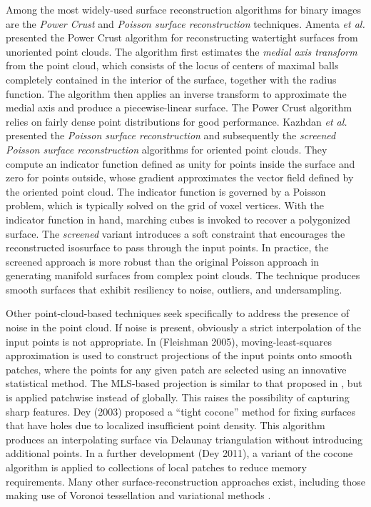 Among the most widely-used surface reconstruction algorithms for binary images are the \textit{Power Crust} and \textit{Poisson surface reconstruction} techniques. Amenta \textit{et al.} \cite{amenta_2001} presented the Power Crust algorithm for reconstructing watertight surfaces from unoriented point clouds. The algorithm first estimates the \textit{medial axis transform} from the point cloud, which consists of the locus of centers of maximal balls completely contained in the interior of the surface, together with the radius function. The algorithm then applies an inverse transform to approximate the medial axis and produce a piecewise-linear surface. The Power Crust algorithm relies on fairly dense point distributions for good performance.  Kazhdan \textit{et al.} presented the \textit{Poisson surface reconstruction} \cite{kazhdan_2008} and subsequently the \textit{screened Poisson surface reconstruction} \cite{kazhdan_2013} algorithms for oriented point clouds. They compute an indicator function defined as unity for points inside the surface and zero for points outside, whose gradient approximates the vector field defined by the oriented point cloud. The indicator function is governed by a Poisson problem, which is typically solved on the grid of voxel vertices.  With the indicator function in hand, marching cubes is invoked to recover a polygonized surface.  The \textit{screened} variant introduces a soft constraint that encourages the reconstructed isosurface to pass through the input points. In practice, the screened approach is more robust than the original Poisson approach in generating manifold surfaces from complex point clouds. The technique produces smooth surfaces that exhibit resiliency to noise, outliers, and undersampling.

Other point-cloud-based techniques seek specifically to address the presence of noise in the point cloud.  If noise is present, obviously a strict interpolation of the input points is not appropriate.  In (Fleishman 2005), moving-least-squares approximation is used to construct projections of the input points onto smooth patches, where the points for any given patch are selected using an innovative statistical method.  The MLS-based projection is similar to that proposed in \cite{levin2004}, but is applied patchwise instead of globally.  This raises the possibility of capturing sharp features. Dey (2003) proposed a ``tight cocone'' method for fixing surfaces that have holes due to localized insufficient point density.  This algorithm produces an interpolating surface via Delaunay triangulation without introducing additional points.  In a further development (Dey 2011), a variant of the cocone algorithm is applied to collections of local patches to reduce memory requirements.  Many other surface-reconstruction approaches exist, including those making use of Voronoi tessellation and variational methods \cite{berger}.

